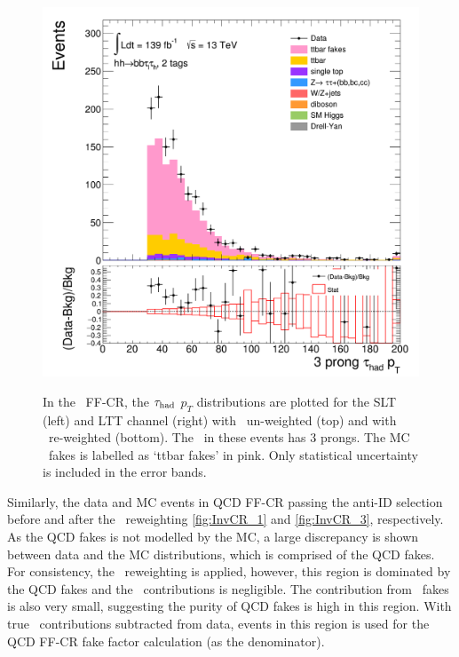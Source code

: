 \begin{figure}[htbp]
\includegraphics[width=.45\textwidth]{DiHiggs/plots/FF_CRs/ttbarCR_LTT_weighted/HNone/BDTVarsHighMbb/2/C_2tag2pjet_0ptv_TauPt3P.png}\\
\caption{In the \ttbar\ FF-CR, the $\tau_{\mathrm{had}}$ $p_T$ distributions are plotted 
for the SLT (left) and LTT channel (right) 
with \ttbar\ un-weighted (top) 
and with \ttbar\ re-weighted (bottom).
The \tauhad\ in these events has 3 prongs. 
The MC \ttbar\ fakes is labelled as `ttbar fakes' in pink.
Only statistical uncertainty is included in the error bands.
}
\label{fig:ttbarCR_3}
\end{figure} 


\newpage
Similarly, the data and MC events in QCD FF-CR passing the anti-ID selection 
before and after the \ttbar\ reweighting 
\ref{fig:InvCR_1} and \ref{fig:InvCR_3}, respectively.
As the QCD fakes is not modelled by the MC, a large discrepancy
is shown between data and the MC distributions, which is comprised
of the QCD fakes. 
For consistency, the \ttbar\ reweighting is applied, 
however, this region is dominated 
by the QCD fakes and the \ttbar\ contributions is negligible. 
The contribution from \ttbar\ fakes is also very small, suggesting 
the purity of QCD fakes is high in this region. 
With true \tauhad\ contributions subtracted from data, 
events in this region is used for the QCD FF-CR fake factor calculation
(as the denominator). 

